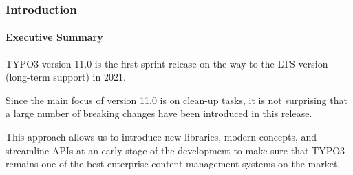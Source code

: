 %

\begin{frame}[fragile]
	\frametitle{Introduction}
	\framesubtitle{Executive Summary}

	\small
		TYPO3 version 11.0 is the first sprint release on the way to the LTS-version
		(long-term support) in 2021.

		\vspace{0.2cm}

		Since the main focus of version 11.0 is on clean-up tasks, it is not surprising
		that a large number of breaking changes have been introduced in this release.

		\vspace{0.2cm}

		This approach allows us to introduce new libraries, modern concepts, and
		streamline APIs at an early stage of the development to make sure that TYPO3
		remains one of the best enterprise content management systems on the market.

		\vspace{0.2cm}

	\normalsize

\end{frame}

